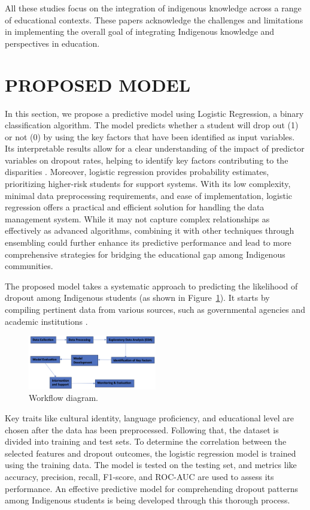 \documentclass[a4paper,twoside]{article}
\begin{document}
All these studies focus on the integration of indigenous knowledge across
a range of educational contexts. These papers acknowledge the challenges
and limitations in implementing the overall goal of integrating Indigenous
knowledge and perspectives in education.

\section{\uppercase{Proposed Model}}
\label{sec:Proposed Methodology}
In this section, we propose a predictive model using Logistic Regression, a
binary classification algorithm. The model predicts whether a student will
drop out (1) or not (0) by using the key factors that have been identified
as input variables. Its interpretable results allow for a clear understanding of the impact of predictor variables on dropout rates, helping to identify key factors contributing to the disparities \cite{Das21}. Moreover, logistic regression provides probability estimates, prioritizing higher-risk students for support systems. With its low complexity, minimal data preprocessing requirements, and ease of implementation, logistic regression offers a practical and efficient solution for handling the data management system. While it may not capture complex relationships as effectively as advanced algorithms, combining it with other techniques through ensembling could further enhance its predictive performance and lead to more comprehensive strategies for bridging the educational gap among Indigenous communities.

The proposed model takes a systematic approach to predicting the likelihood of dropout among Indigenous students (as shown in Figure~\ref{fig:flowdiagram}). It starts by compiling pertinent
data from various sources, such as governmental agencies and academic
institutions \cite{Bisong19}. 
\begin{figure}[H]
    \centering 
    \includegraphics[width=0.5\textwidth, angle=0]{images/FlowDiagram.png}	
    \captionsetup{format=plain, justification=centering}
    \caption{Workflow diagram.}
    \label{fig:flowdiagram}
\end{figure}

Key traits like cultural identity, language proficiency, and educational level are chosen after the data has been preprocessed. Following that, the dataset is divided into training and test sets. To determine the correlation between the selected features and dropout outcomes, the logistic regression model is trained using the training data. The model is tested on the testing set, and metrics like accuracy, precision, recall, F1-score, and ROC-AUC \cite{GMK20} are used to assess its performance. An effective predictive model for comprehending dropout patterns among Indigenous students is being developed through this thorough process.
\end{document}
